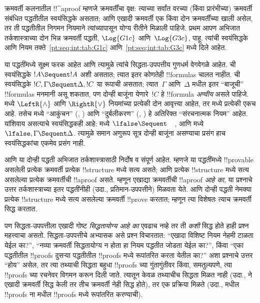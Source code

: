 \documentclass[../../../include/open-logic-section]{subfiles}
\begin{document}
क्रमवर्ती कलनातील !!^a{proof} म्हणजे
क्रमवर्तींचा वृक्ष: त्याच्या सर्वांत वरच्या (किंवा
प्रारंभीच्या) क्रमवर्ती संबंधित पद्धतीतील स्वयंसिद्धके
असतात; आणि एखादी क्रमवर्ती एक किंवा दोन क्रमवर्तींच्या
खाली असेल, तर ती पद्धतीतील निगमन नियमाने त्यांच्यापासून
योग्य रीतीने मिळाली पाहिजे. प्रथम आपण अभिजात
तर्कशास्त्राच्या दोन भिन्न क्रमवर्ती पद्धती, $\Log{G1c}$
आणि~$\Log{G3c}$, पाहू. त्यांची स्वयंसिद्धके आणि नियम
तक्ते~\ref{pt:seq:int:tab:G1c} आणि~\ref{pt:seq:int:tab:G3c}
मध्ये दिले आहेत. 




या पद्धतींमध्ये सूक्ष्म फरक आहेत आणि त्यामुळे
त्यांचे सिद्धता-उपपत्तीय गुणधर्म वेगवेगळे आहेत.
 ची स्वयंसिद्धके $!A
\Sequent !A$ अशी असतात; त्यात इतर कोणतेही
!!{formula}s चालत नाहीत.  ची स्वयंसिद्धके
$!C, \Gamma \Sequent \Delta, !C$ या रूपाची
असतात; त्यात~$\Gamma$ आणि~$\Delta$ मधील इतर
``बाजूची'' !!{formula}s मनमानी असू शकतात, पण
दोन्ही बाजूंना येणारे~$!C$ हे !!{formula}
\emph{अण्वीय} असले पाहिजे.  मध्ये
$\LeftR{\land}$ आणि $\RightR{\lor}$ नियमांच्या
प्रत्येकी दोन आवृत्त्या आहेत, तर  मध्ये
प्रत्येकी एकच आहे. तसेच  मध्ये
``आकुंचन'' (\LeftR{\Contraction}, \RightR{\Contraction})
आणि ``दुर्बलीकरण'' (\LeftR{\Weakening}, \RightR{\Weakening})
हे अतिरिक्त ``संरचनात्मक नियम'' आहेत.
यांशिवाय असत्याचे स्वयंसिद्धकही आहे:  मध्ये
$\lfalse\Sequent\quad$, आणि  मध्ये
$\lfalse,\Gamma\Sequent\Delta$. त्यामुळे समान
अणुरूप सूत्र दोन्ही बाजूंना असण्याचा प्रसंग हाच
स्वयंसिद्धकांचा एकमेव प्रसंग नाही.

 आणि  या दोन्ही
पद्धती अभिजात तर्कशास्त्रासाठी निर्दोष व संपूर्ण
आहेत. म्हणजे या पद्धतींमध्ये !!{provable} असलेली
प्रत्येक क्रमवर्ती प्रत्येक !!{structure} मध्ये सत्य
असते; आणि प्रत्येक !!{structure} मध्ये सत्य असलेल्या
प्रत्येक क्रमवर्तीची !!a{proof} असते. म्हणून एखाद्या
क्रमवर्तीची !!a{proof} \emph{आहे का}, या प्रश्नाचे
उत्तर तर्कशास्त्राच्या इतर पद्धतींनीही (उदा.,
प्रतिमान-उपपत्तीने) मिळवता येते. आणि दोन्ही पद्धती
नेमक्या प्रत्येक !!{structure} मध्ये सत्य असलेल्या
क्रमवर्ती !!{prove} करतात; म्हणून त्या विशेषतः
त्याच क्रमवर्ती सिद्ध करतात.

पण सिद्धता-उपपत्तीला एखादी गोष्ट
\emph{सिद्धतायोग्य आहे का} एवढाच नव्हे तर ती
\emph{कशी} सिद्ध होते हाही प्रश्न महत्त्वाचा असतो.
सिद्धता-उपपत्तीचे अभ्यासक असे प्रश्न विचारतात:
``एखादा विशिष्ट नियम नेहमी टाळता येईल का?'',
``नव्या क्रमवर्ती सिद्धतायोग्य न होता हा नियम पद्धतीत
जोडता येईल का?'', किंवा ``एका पद्धतीतील !!{proof}s
दुसऱ्या पद्धतीतील !!{proof}s मध्ये रूपांतरित करता
येतील का?'' अशा प्रश्नाचे उत्तर ``होय'' असेल, तर
त्या तथ्याची सिद्धता बहुधा !!{proof}s च्या
गुंतागुंतीवर किंवा, समतुल्यपणे, त्या !!{proof}s च्या रचनेवर
विगमन करून दिली जाते. त्यातून केवळ तथ्याचीच
सिद्धता मिळत नाही (उदा.,  ने एखादी
क्रमवर्ती सिद्ध केली तर तीच क्रमवर्ती 
नेही सिद्ध होते), तर एक प्रक्रिया मिळते (उदा.,
 मधील !!{proof}s ना  मधील
!!{proof}s मध्ये रूपांतरित करण्याची).
\end{document}
